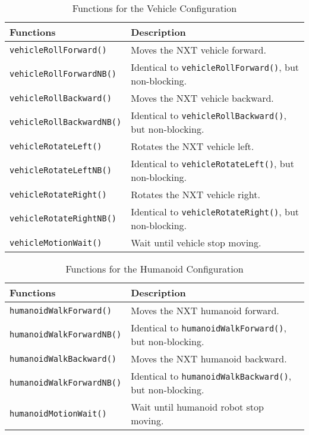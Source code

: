 \begin{longtable}{p{6cm}p{10cm}}
\caption{Functions for the Vehicle Configuration
\label{tab:function_vehicle}}\\
\hline
Functions & Description\\
\hline
{\tt vehicleRollForward()}      &Moves the NXT vehicle forward.\\
{\tt vehicleRollForwardNB()}    &Identical to {\tt vehicleRollForward()}, but non-blocking.\\
{\tt vehicleRollBackward()}     &Moves the NXT vehicle backward.\\
{\tt vehicleRollBackwardNB()}   &Identical to {\tt vehicleRollBackward()}, but non-blocking.\\
{\tt vehicleRotateLeft()}       &Rotates the NXT vehicle left.\\
{\tt vehicleRotateLeftNB()}     &Identical to {\tt vehicleRotateLeft()}, but non-blocking.\\
{\tt vehicleRotateRight()}      &Rotates the NXT vehicle right.\\
{\tt vehicleRotateRightNB()}    &Identical to {\tt vehicleRotateRight()}, but non-blocking.\\
{\tt vehicleMotionWait()}       &Wait until vehicle stop moving.\\
\hline
\end{longtable}

\begin{longtable}{p{6cm}p{10cm}}
    \caption{Functions for the Humanoid Configuration
    \label{tab:function_humanoid}}\\
    \hline
    Functions & Description\\ \hline
        {\tt humanoidWalkForward()}   &Moves the NXT humanoid forward.\\
        {\tt humanoidWalkForwardNB()} &Identical to {\tt humanoidWalkForward()}, but non-blocking.\\
        {\tt humanoidWalkBackward()}  &Moves the NXT humanoid backward.\\
        {\tt humanoidWalkForwardNB()} &Identical to {\tt humanoidWalkBackward()}, but non-blocking.\\
        {\tt humanoidMotionWait()}    &Wait until humanoid robot stop moving.\\
    \hline
\end{longtable}

